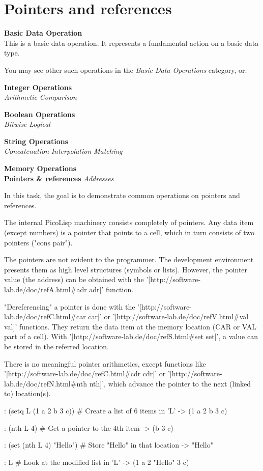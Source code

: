 \pagebreak{}
\section*{Pointers and references}

\textbf{Basic Data Operation}\\ This is a basic data operation. It
represents a fundamental action on a basic data type.

You may see other such operations in the \emph{Basic Data Operations}
category, or:

\textbf{Integer Operations} \\
\emph{Arithmetic} \textbar{} \emph{Comparison}

\textbf{Boolean Operations} \\ \emph{Bitwise} \textbar{}
\emph{Logical}

\textbf{String Operations} \\
\emph{Concatenation} \textbar{} \emph{Interpolation} \textbar{}
\emph{Matching}

\textbf{Memory Operations} \\ \textbf{Pointers \& references}
\textbar{} \emph{Addresses}

In this task, the goal is to demonstrate common operations on pointers
and references.


\begin{wideverbatim}

The internal PicoLisp machinery consists completely of pointers. Any data item
(except numbers) is a pointer that points to a cell, which in turn consists of
two pointers ("cons pair").

The pointers are not evident to the programmer. The development environment
presents them as high level structures (symbols or lists). However, the pointer
value (the address) can be obtained with the
'[http://software-lab.de/doc/refA.html#adr adr]' function.

"Dereferencing" a pointer is done with the
'[http://software-lab.de/doc/refC.html#car car]' or
'[http://software-lab.de/doc/refV.html#val val]' functions. They return the data
item at the memory location (CAR or VAL part of a cell). With
'[http://software-lab.de/doc/refS.html#set set]', a value can be stored in the
referred location.

There is no meaningful pointer arithmetics, except functions like
'[http://software-lab.de/doc/refC.html#cdr cdr]' or
'[http://software-lab.de/doc/refN.html#nth nth]', which advance the pointer to
the next (linked to) location(s).

: (setq L (1 a 2 b 3 c))         # Create a list of 6 items in 'L'
-> (1 a 2 b 3 c)

: (nth L 4)                      # Get a pointer to the 4th item
-> (b 3 c)

: (set (nth L 4) "Hello")        # Store "Hello" in that location
-> "Hello"

: L                              # Look at the modified list in 'L'
-> (1 a 2 "Hello" 3 c)

\end{wideverbatim}

